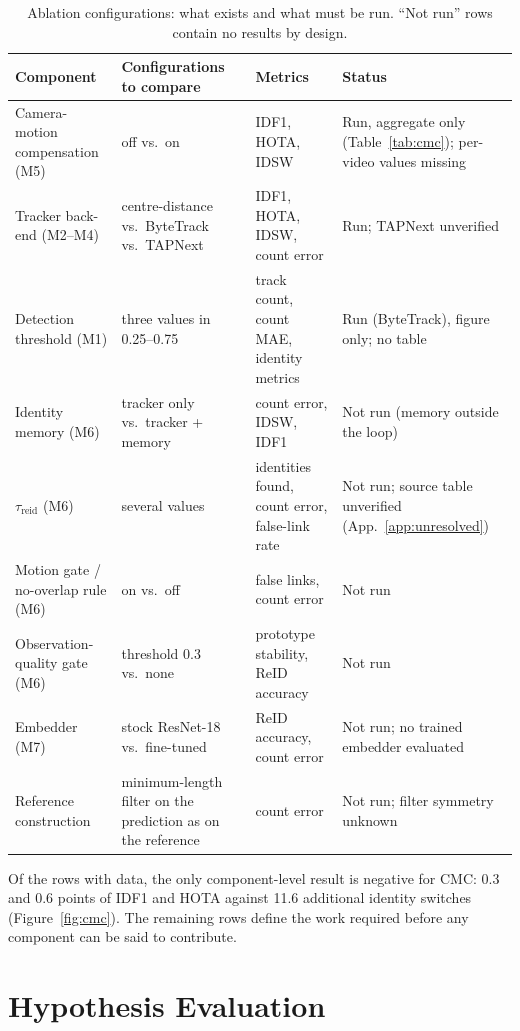 \documentclass[11pt,a4paper]{article}
\begin{document}
\begin{table}[t]
\caption{Ablation configurations: what exists and what must be run. ``Not run'' rows contain no results by design.}\label{tab:ablation}
\centering\normalsize
\begin{tabular}{p{3.0cm}p{4.0cm}p{3.1cm}p{3.6cm}}
\toprule
Component & Configurations to compare & Metrics & Status\\
\midrule
Camera-motion compensation (M5) & off vs.\ on & IDF1, HOTA, IDSW & Run, aggregate only (Table~\ref{tab:cmc}); per-video values missing\\
Tracker back-end (M2--M4) & centre-distance vs.\ ByteTrack vs.\ TAPNext & IDF1, HOTA, IDSW, count error & Run; TAPNext unverified\\
Detection threshold (M1) & three values in 0.25--0.75 & track count, count MAE, identity metrics & Run (ByteTrack), figure only; no table\\
Identity memory (M6) & tracker only vs.\ tracker + memory & count error, IDSW, IDF1 & Not run (memory outside the loop)\\
$\tau_{\mathrm{reid}}$ (M6) & several values & identities found, count error, false-link rate & Not run; source table unverified (App.~\ref{app:unresolved})\\
Motion gate / no-overlap rule (M6) & on vs.\ off & false links, count error & Not run\\
Observation-quality gate (M6) & threshold 0.3 vs.\ none & prototype stability, ReID accuracy & Not run\\
Embedder (M7) & stock ResNet-18 vs.\ fine-tuned & ReID accuracy, count error & Not run; no trained embedder evaluated\\
Reference construction & minimum-length filter on the prediction as on the reference & count error & Not run; filter symmetry unknown\\
\bottomrule
\end{tabular}
\end{table}

Of the rows with data, the only component-level result is negative for CMC: 0.3 and 0.6 points of IDF1 and HOTA against 11.6 additional identity switches (Figure~\ref{fig:cmc}). The remaining rows define the work required before any component can be said to contribute.

\section{Hypothesis Evaluation}\label{sec:hyp}
\end{document}

